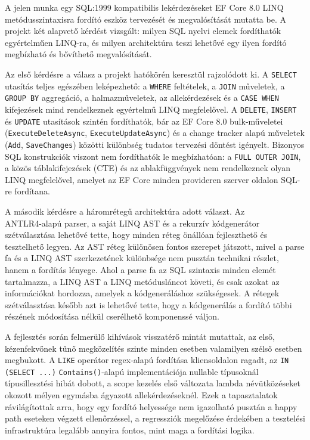 
A jelen munka egy SQL:1999 kompatibilis lekérdezéseket EF Core 8.0 LINQ metódusszintaxisra fordító eszköz tervezését és megvalósítását mutatta be. A projekt két alapvető kérdést vizsgált: milyen SQL nyelvi elemek fordíthatók egyértelműen LINQ-ra, és milyen architektúra teszi lehetővé egy ilyen fordító megbízható és bővíthető megvalósítását.

Az első kérdésre a válasz a projekt hatókörén keresztül rajzolódott ki. A \texttt{SELECT} utasítás teljes egészében leképezhető: a \texttt{WHERE} feltételek, a \texttt{JOIN} műveletek, a \texttt{GROUP BY} aggregáció, a halmazműveletek, az allekérdezések és a \texttt{CASE WHEN} kifejezések mind rendelkeznek egyértelmű LINQ megfelelővel. A \texttt{DELETE}, \texttt{INSERT} és \texttt{UPDATE} utasítások szintén fordíthatók, bár az EF Core 8.0 bulk-műveletei (\texttt{ExecuteDeleteAsync}, \texttt{ExecuteUpdateAsync}) és a change tracker alapú műveletek (\texttt{Add}, \texttt{SaveChanges}) közötti különbség tudatos tervezési döntést igényelt. Bizonyos SQL konstrukciók viszont nem fordíthatók le megbízhatóan: a \texttt{FULL OUTER JOIN}, a közös táblakifejezések (CTE) és az ablakfüggvények nem rendelkeznek olyan LINQ megfelelővel, amelyet az EF Core minden provideren szerver oldalon SQL-re fordítana.

A második kérdésre a háromrétegű architektúra adott választ. Az \\ANTLR4-alapú parser, a saját LINQ AST és a rekurzív kódgenerátor szétválasztása lehetővé tette, hogy minden réteg önállóan fejleszthető és tesztelhető legyen. Az AST réteg különösen fontos szerepet játszott, mivel a parse fa és a LINQ AST szerkezetének különbsége nem pusztán technikai részlet, hanem a fordítás lényege. Ahol a parse fa az SQL szintaxis minden elemét tartalmazza, a LINQ AST a LINQ metódusláncot követi, és csak azokat az információkat hordozza, amelyek a kódgeneráláshoz szükségesek. A rétegek szétválasztása később azt is lehetővé tette, hogy a kódgenerálás a fordító többi részének módosítása nélkül cserélhető komponenssé váljon.

A fejlesztés során felmerülő kihívások visszatérő mintát mutattak, az első, kézenfekvőnek tűnő megközelítés szinte minden esetben valamilyen szélső esetben megbukott. A \texttt{LIKE} operátor regex-alapú fordítása kliensoldalon ragadt, az \texttt{IN (SELECT ...)} \texttt{Contains()}-alapú implementációja nullable típusoknál típusillesztési hibát dobott, a scope kezelés első változata lambda névütközéseket okozott mélyen egymásba ágyazott allekérdezéseknél. Ezek a tapasztalatok rávilágítottak arra, hogy egy fordító helyessége nem igazolható pusztán a happy path eseteken végzett ellenőrzéssel, a regressziók megelőzése érdekében a tesztelési infrastruktúra legalább annyira fontos, mint maga a fordítási logika.

